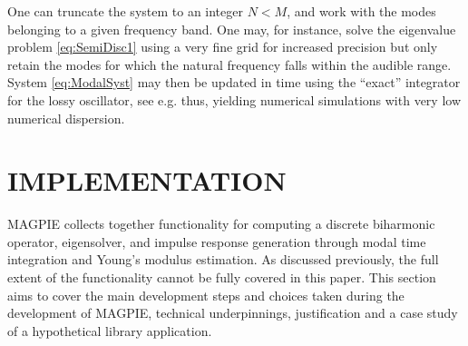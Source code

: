 One can truncate the system to an integer $N < M$, and work with the modes belonging to a given frequency band. One may, for instance, solve the eigenvalue problem \eqref{eq:SemiDisc1} using a very fine grid for increased precision but only retain the modes for which the natural frequency falls within the audible range. System \ref{eq:ModalSyst} may then be updated in time using the ``exact'' integrator for the lossy oscillator, see e.g. \cite{Cieśliński_JDEA_2011} thus, yielding numerical simulations with very low numerical dispersion.


\section{IMPLEMENTATION}\label{sec:implementation}

MAGPIE collects together functionality for computing a discrete biharmonic operator, eigensolver, and impulse response generation through modal time integration and Young's modulus estimation. As discussed previously, the full extent of the functionality cannot be fully covered in this paper. This section aims to cover the main development steps and choices taken during the development of MAGPIE, technical underpinnings, justification and a case study of a hypothetical library application.

